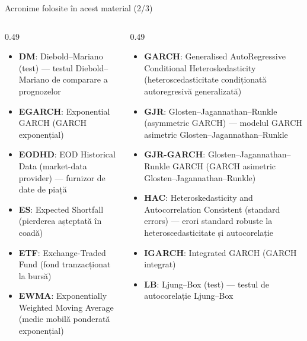 \begin{frame}{Acronime folosite în acest material (2/3)}
\begin{columns}[T]
\begin{column}{0.49\textwidth}
\begin{itemize}\setlength{\itemsep}{0pt}
    \item \textbf{DM}: Diebold–Mariano (test) — testul Diebold–Mariano de comparare a prognozelor
    \item \textbf{EGARCH}: Exponential GARCH (GARCH exponențial)
    \item \textbf{EODHD}: EOD Historical Data (market-data provider) — furnizor de date de piață
    \item \textbf{ES}: Expected Shortfall (pierderea așteptată în coadă)
    \item \textbf{ETF}: Exchange-Traded Fund (fond tranzacționat la bursă)
    \item \textbf{EWMA}: Exponentially Weighted Moving Average (medie mobilă ponderată exponențial)
\end{itemize}
\end{column}
\begin{column}{0.49\textwidth}
\begin{itemize}\setlength{\itemsep}{0pt}
    \item \textbf{GARCH}: Generalised AutoRegressive Conditional Heteroskedasticity (heteroscedasticitate condiționată autoregresivă generalizată)
    \item \textbf{GJR}: Glosten–Jagannathan–Runkle (asymmetric GARCH) — modelul GARCH asimetric Glosten–Jagannathan–Runkle
    \item \textbf{GJR-GARCH}: Glosten–Jagannathan–Runkle GARCH (GARCH asimetric Glosten–Jagannathan–Runkle)
    \item \textbf{HAC}: Heteroskedasticity and Autocorrelation Consistent (standard errors) — erori standard robuste la heteroscedasticitate și autocorelație
    \item \textbf{IGARCH}: Integrated GARCH (GARCH integrat)
    \item \textbf{LB}: Ljung–Box (test) — testul de autocorelație Ljung–Box
\end{itemize}
\end{column}
\end{columns}
\end{frame}
